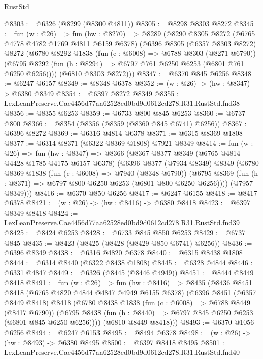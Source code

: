 \begin{lexlean}{RustStd}
\begin{coremodule}
@8303 := @6326 (@8299 (@8300 @4811))
@8305 := @8298 @8303 @8272
@8345 := fun (w : @26) =>
  fun (hw : @8270) =>
  @8289
    (@8290
      @8305
      @8272
      (@6765 @4778 @4782 @1769 @4811 @6159 @6378)
      (@6396
        @8305
        (@6357 @8303 @8272)
        @8272
        (@6780
          @8292
          @1838
          (fun (c : @6008) => @6788 @8303 (@8271 @6790))
          (@6795 @8292 (fun (h : @8294) => @6797 @761 @6250 @6253 (@6801 @761 @6250 @6256))))
        (@6810 @8303 @8272)))
@8347 := @6370 @845 @6256
@8348 := @6247 @6157
@8349 := @8348 @6378
@8352 := (w : @26) -> (hw : @8347) -> @6380 @8349
@8354 := @6397 @8272 @8349
@8355 := LexLeanPreserve.Cae4456d77aa62528ed0bd9d0612cd278.R31.RustStd.fnd38
@8356 := @8355 @6253
@8359 := @6733 @800 @845 @6253
@8360 := @6737 @800
@8366 := @8354 (@8356 (@8359 (@8360 @845 @6741) @6256))
@8367 := @6396 @8272
@8369 := @6316 @4814 @6378
@8371 := @6315 @8369 @1808
@8377 := @6314 @8371 (@6322 @8369 @1808) @7921 @8349
@8414 := fun (w : @26) =>
  fun (hw : @8347) =>
  @8366
    (@8367
      @8377
      @8349
      (@6765 @4814 @4428 @1785 @4175 @6157 @6378)
      (@6396
        @8377
        (@7934 @8349)
        @8349
        (@6780
          @8369
          @1838
          (fun (c : @6008) => @7940 (@8348 @6790))
          (@6795 @8369 (fun (h : @8371) => @6797 @800 @6250 @6253 (@6801 @800 @6250 @6256))))
        (@7957 @8349)))
@8416 := @6370 @850 @6256
@8417 := @6247 @6155
@8418 := @8417 @6378
@8421 := (w : @26) -> (hw : @8416) -> @6380 @8418
@8423 := @6397 @8349 @8418
@8424 := LexLeanPreserve.Cae4456d77aa62528ed0bd9d0612cd278.R31.RustStd.fnd39
@8425 := @8424 @6253
@8428 := @6733 @845 @850 @6253
@8429 := @6737 @845
@8435 := @8423 (@8425 (@8428 (@8429 @850 @6741) @6256))
@8436 := @6396 @8349
@8438 := @6316 @4820 @6378
@8440 := @6315 @8438 @1808
@8444 := @6314 @8440 (@6322 @8438 @1808)
@8445 := @6328 @4844
@8446 := @6331 @4847
@8449 := @6326 (@8445 (@8446 @4949))
@8451 := @8444 @8449 @8418
@8491 := fun (w : @26) =>
  fun (hw : @8416) =>
  @8435
    (@8436
      @8451
      @8418
      (@6765 @4820 @4844 @4847 @4949 @6155 @6378)
      (@6396
        @8451
        (@6357 @8449 @8418)
        @8418
        (@6780
          @8438
          @1838
          (fun (c : @6008) => @6788 @8449 (@8417 @6790))
          (@6795 @8438 (fun (h : @8440) => @6797 @845 @6250 @6253 (@6801 @845 @6250 @6256))))
        (@6810 @8449 @8418)))
@8493 := @6370 @1056 @6256
@8494 := @6247 @6153
@8495 := @8494 @6378
@8498 := (w : @26) -> (hw : @8493) -> @6380 @8495
@8500 := @6397 @8418 @8495
@8501 := LexLeanPreserve.Cae4456d77aa62528ed0bd9d0612cd278.R31.RustStd.fnd40

\end{coremodule}
\end{lexlean}
